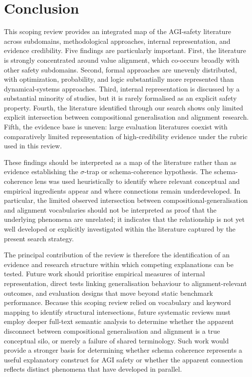 \section{Conclusion}\label{sec:conclusion}

This scoping review provides an integrated map of the AGI-safety literature across subdomains, methodological approaches, internal representation, and evidence credibility. Five findings are particularly important. First, the literature is strongly concentrated around value alignment, which co-occurs broadly with other safety subdomains. Second, formal approaches are unevenly distributed, with optimization, probability, and logic substantially more represented than dynamical-systems approaches. Third, internal representation is discussed by a substantial minority of studies, but it is rarely formalised as an explicit safety property. Fourth, the literature identified through our search shows only limited explicit intersection between compositional generalisation and alignment research. Fifth, the evidence base is uneven: large evaluation literatures coexist with comparatively limited representation of high-credibility evidence under the rubric used in this review.

These findings should be interpreted as a map of the literature rather than as evidence establishing the $\sigma$-trap or schema-coherence hypothesis. The schema-coherence lens was used heuristically to identify where relevant conceptual and empirical ingredients appear and where connections remain underdeveloped. In particular, the limited observed intersection between compositional-generalisation and alignment vocabularies should not be interpreted as proof that the underlying phenomena are unrelated; it indicates that the relationship is not yet well developed or explicitly investigated within the literature captured by the present search strategy.

The principal contribution of the review is therefore the identification of an evidence and research structure within which competing explanations can be tested. Future work should prioritise empirical measures of internal representation, direct tests linking generalisation behaviour to alignment-relevant outcomes, and evaluation designs that move beyond static benchmark performance. Because this scoping review relied on vocabulary and keyword mapping to identify structural intersections, future systematic reviews must employ deeper full-text semantic analysis to determine whether the apparent disconnect between compositional generalisation and alignment is a true conceptual silo, or merely a failure of shared terminology. Such work would provide a stronger basis for determining whether schema coherence represents a useful explanatory construct for AGI safety or whether the apparent connection reflects distinct phenomena that have developed in parallel.

